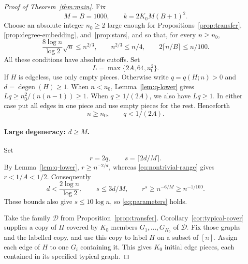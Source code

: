 \documentclass[11pt]{article}
\theoremstyle{remark}
\numberwithin{equation}{section}
\newcommand{\calD}{\mathcal D}
\DeclareMathOperator{\degen}{degen}
\begin{document}
\begin{proof}[Proof of Theorem~\ref{thm:main}]
Fix
\begin{equation}\label{eq:constants}
 M=B=1000,\qquad k=2K_0M(B+1)^2.
\end{equation}
Choose an absolute integer $n_0\geq2$ large enough for
Propositions~\ref{prop:transfer}, \ref{prop:degree-embedding},
and~\ref{prop:stars}, and so that, for every $n\geq n_0$,
\begin{equation}\label{eq:deterministic-cutoffs}
 \frac{8\log n}{\log2}\sqrt n\leq n^{2/3},\qquad
 n^{2/3}\leq n/4,\qquad
 2\lceil n/B\rceil\leq n/100.
\end{equation}
All these conditions have absolute cutoffs. Set
\[
 L=\max\{2A,64,n_0^2\}.
\]
If $H$ is edgeless, use only empty pieces. Otherwise write
$q=q(H;n)>0$ and $d=\degen(H)\geq1$.
When $n<n_0$, Lemma~\ref{lem:q-lower} gives
$Lq\geq n_0^2/(n(n-1))\geq1$. When $q\geq1/(2A)$,
we also have $Lq\geq1$. In either case put all edges in one
piece and use empty pieces for the rest. Henceforth
\begin{equation}\label{eq:nontrivial-range}
 n\geq n_0,\qquad q<1/(2A).
\end{equation}

\paragraph{Large degeneracy: $d\geq M$.}
Set
\[
 r=2q,\qquad s=\lceil2d/M\rceil.
\]
By Lemma~\ref{lem:q-lower}, $r\geq n^{-2/d}$, whereas
\eqref{eq:nontrivial-range} gives $r<1/A<1/2$. Consequently
\begin{equation}\label{eq:d-upper}
 d<\frac{2\log n}{\log2},\qquad s\leq3d/M,
 \qquad r^s\geq n^{-6/M}\geq n^{-1/100}.
\end{equation}
These bounds also give $s\leq10\log n$, so
\eqref{eq:parameters} holds.

Take the family $\calD$ from Proposition~\ref{prop:transfer}.
Corollary~\ref{cor:typical-cover} supplies a copy of $H$ covered
by $K_0$ members $G_1,\ldots,G_{K_0}$ of $\calD$.
Fix those graphs and the labelled copy, and use this copy to
label $H$ on a subset of $[n]$. Assign each edge of $H$ to
one $G_i$ containing it. This gives $K_0$ initial edge pieces,
each contained in its specified typical graph.


\end{proof}
\end{document}
